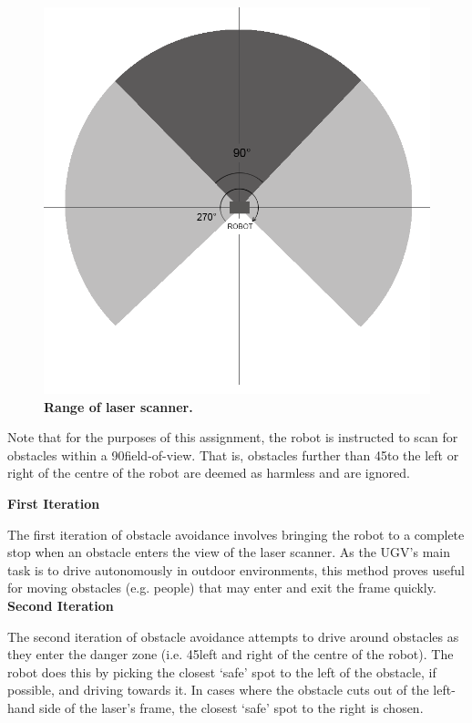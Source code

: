 \documentclass[titlepage,12pt,a4paper]{article}
\begin{document}
\begin{figure}[h]
	\centering
	\includegraphics[scale=0.34]{laser.png}
	\caption{\textbf{Range of laser scanner.}}
\end{figure}

Note that for the purposes of this assignment, the robot is instructed to scan for obstacles within a 90\degree field-of-view. That is, obstacles further than 45\degree to the left or right of the centre of the robot are deemed as harmless and are ignored.

\textbf{First Iteration}

The first iteration of obstacle avoidance involves bringing the robot to a complete stop when an obstacle enters the view of the laser scanner. As the UGV's main task is to drive autonomously in outdoor environments, this method proves useful for moving obstacles (e.g. people) that may enter and exit the frame quickly. \\

\textbf{Second Iteration}

The second iteration of obstacle avoidance attempts to drive around obstacles as they enter the danger zone (i.e. 45\degree left and right of the centre of the robot). The robot does this by picking the closest `safe' spot to the left of the obstacle, if possible, and driving towards it. In cases where the obstacle cuts out of the left-hand side of the laser's frame, the closest `safe' spot to the right is chosen. 
\end{document}
